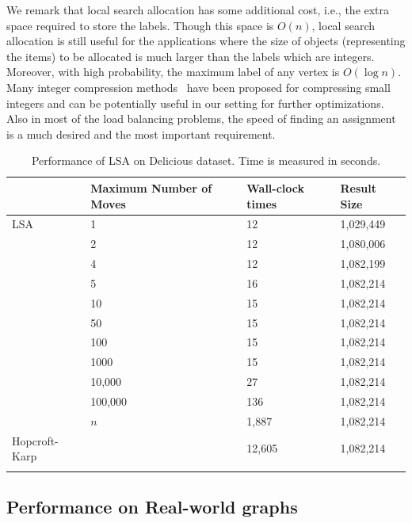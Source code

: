 We remark that local search allocation has some additional cost, i.e., the extra space required to store the labels. Though this space is $O(n)$, local search allocation is still useful for the applications where the size of objects (representing the items) to be allocated is much larger than the labels which are integers. Moreover, with high probability, the maximum label of any vertex is $O(\log n)$. Many integer compression methods~\cite{inp:sgl10} have been proposed for compressing small integers and can be potentially useful in our setting for further optimizations. Also in most of the load balancing problems, the speed of finding an assignment is a much desired and the most important requirement.

\begin{table}[ht!]
\centering
\footnotesize
\begin{tabular}{@{}l l l l @{}}
\toprule
\multicolumn{1}{l}{} & Maximum Number of Moves                  & Wall-clock times     & Result Size  \\
\hline \noalign{\smallskip}
LSA        &   1      & 12    & 1,029,449  \\
       &   2      & 12    & 1,080,006  \\
        &   4      & 12    & 1,082,199  \\
        &   5      & 16    & 1,082,214  \\
        &   10      & 15    & 1,082,214  \\
        &   50     & 15    & 1,082,214  \\
        &   100     & 15    & 1,082,214  \\
        &   1000     & 15    & 1,082,214  \\
        &   10,000    & 27    & 1,082,214  \\
        &   100,000    & 136    & 1,082,214  \\
        &   $n$    & 1,887    & 1,082,214  \\
\midrule

Hopcroft-Karp                &  & 12,605 & 1,082,214 \\

\hline \noalign{\smallskip}
\end{tabular}
\caption{Performance of LSA on \textsf{Delicious} dataset. Time is measured in seconds.}
\label{table:softlabel}
\end{table}

\subsection{Performance on Real-world graphs}

